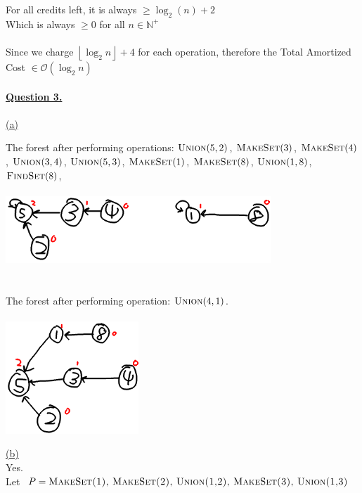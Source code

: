 \documentclass[12pt]{article}
\newcommand{\N}{\mathbb{N}}
\newcommand{\floorSurround}[1]{\left\lfloor#1\right\rfloor}
\def \calO {\mathcal{O}}
\begin{document}
For all credits left, it is always $\geq \log_2(n) + 2$\\
Which is always $\geq 0$ for all $n \in \N^+$
\\\\
Since we charge $\floorSurround{\log_2n} + 4$ for each operation, therefore the Total Amortized Cost $\in \calO(\log_2 n)$
\\\\

\newpage
{{\LARGE \noindent \underline{\textbf{Question 3.}}}}
\\\\
\noindent \hyperlink{toc}{\hypertarget{3.1}{(a)}}
\begin{center}
	The forest
after performing operations:
$\textsc{Union}(5,2)$,
$\textsc{MakeSet}(3)$,
$\textsc{MakeSet}(4)$,
$\textsc{Union}(3,4)$,
$\textsc{Union}(5,3)$,
$\textsc{MakeSet}(1)$,
$\textsc{MakeSet}(8)$,
$\textsc{Union}(1,8)$,
$\textsc{FindSet}(8)$,\\\ \\
	\includegraphics[width=10cm]{CSCB63_A3_3-1.png}
	\ \\\ \\\ \\
	The forest after performing operation: $\textsc{Union}(4,1)$.\\\ \\
	\includegraphics[width=5cm]{CSCB63_A3_3-2.png}
\end{center}
\noindent \hyperlink{toc}{\hypertarget{3.2}{(b)}}\\
Yes.\\
Let $P = \textsc{MakeSet(1), MakeSet(2), Union(1,2), MakeSet(3), Union(1,3)}$\\\\
\end{document}
